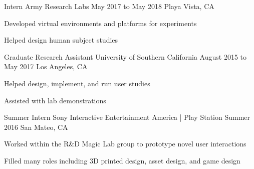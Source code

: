 \begin{cventries}
  \cventry
    {Intern} %
    {Army Research Labs} %
    {May 2017 to May 2018} %
    {Playa Vista, CA} %
    {
      \begin{cvitems} %
        \item {Developed virtual environments and platforms for experiments}
		\item {Helped design human subject studies}
      \end{cvitems}
    }

    
   \cventry
     {Graduate Research Assistant} %
     {University of Southern California} %
     {August 2015 to May 2017} %
     {Los Angeles, CA} %
     {
       \begin{cvitems} %
         \item {Helped design, implement, and run user studies}
 	 \item {Assisted with lab demonstrations}
       \end{cvitems}
     }
    
  \cventry
    {Summer Intern} %
    {Sony Interactive Entertainment America | Play Station} %
    {Summer 2016} %
    {San Mateo, CA} %
    {
      \begin{cvitems} %
        \item {Worked within the R\&D Magic Lab group to prototype novel user interactions}
		\item {Filled many roles including 3D printed design, asset design, and game design}
      \end{cvitems}
    }
    
    

\end{cventries}
